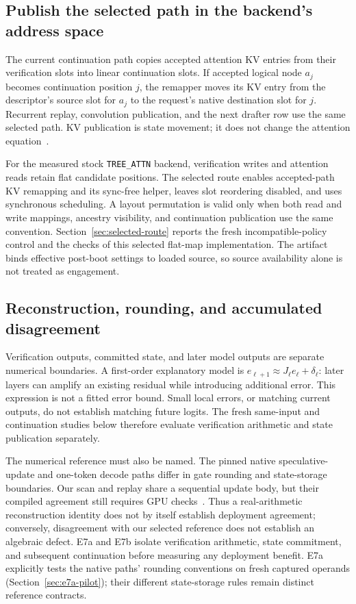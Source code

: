 \documentclass[conference]{IEEEtran}
\begin{document}
\subsection{Publish the selected path in the backend's address space}
The current continuation path copies accepted attention KV entries from their verification slots into linear continuation slots. If accepted logical node $a_j$ becomes continuation position $j$, the remapper moves its KV entry from the descriptor's source slot for $a_j$ to the request's native destination slot for $j$. Recurrent replay, convolution publication, and the next drafter row use the same selected path. KV publication is state movement; it does not change the attention equation~\cite{lumo2026archive}.

For the measured stock \texttt{TREE\_ATTN} backend, verification writes and attention reads retain flat candidate positions. The selected route enables accepted-path KV remapping and its sync-free helper, leaves slot reordering disabled, and uses synchronous scheduling. A layout permutation is valid only when both read and write mappings, ancestry visibility, and continuation publication use the same convention. Section~\ref{sec:selected-route} reports the fresh incompatible-policy control and the checks of this selected flat-map implementation. The artifact binds effective post-boot settings to loaded source, so source availability alone is not treated as engagement.

\subsection{Reconstruction, rounding, and accumulated disagreement}
\label{sec:reconstruction-numerics}
Verification outputs, committed state, and later model outputs are separate numerical boundaries. A first-order explanatory model is $e_{\ell+1}\approx J_\ell e_\ell+\delta_\ell$: later layers can amplify an existing residual while introducing additional error. This expression is not a fitted error bound. Small local errors, or matching current outputs, do not establish matching future logits. The fresh same-input and continuation studies below therefore evaluate verification arithmetic and state publication separately.

The numerical reference must also be named. The pinned native speculative-update and one-token decode paths differ in gate rounding and state-storage boundaries. Our scan and replay share a sequential update body, but their compiled agreement still requires GPU checks~\cite{lumo2026archive}. Thus a real-arithmetic reconstruction identity does not by itself establish deployment agreement; conversely, disagreement with our selected reference does not establish an algebraic defect. E7a and E7b isolate verification arithmetic, state commitment, and subsequent continuation before measuring any deployment benefit. E7a explicitly tests the native paths' rounding conventions on fresh captured operands (Section~\ref{sec:e7a-pilot}); their different state-storage rules remain distinct reference contracts.
\end{document}
